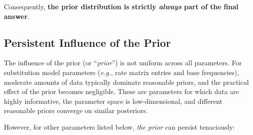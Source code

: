 Consequently, \textbf{the prior distribution is strictly \textit{always} part of the final answer}.

\subsection{Persistent Influence of the Prior}

The influence of the prior (or ``\textit{prior}'') is not uniform across all parameters. For substitution model parameters (\textit{e.g.}, rate matrix entries and base frequencies), moderate amounts of data typically dominate reasonable priors, and the practical effect of the prior becomes negligible. These are parameters for which data are highly informative, the parameter space is low-dimensional, and different reasonable priors converge on similar posteriors.

However, for other parameters listed below, \textit{the prior} can persist tenaciously:

